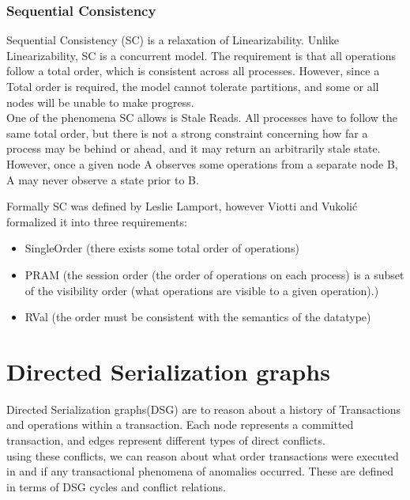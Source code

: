\documentclass[a4paper,10pt,titlepage]{report}
\begin{document}
\subsubsection{Sequential Consistency}
Sequential Consistency (SC) is a relaxation of Linearizability. Unlike Linearizability, SC is a concurrent model. The requirement is that all operations follow a total order, which is consistent across all processes. However, since a Total order is required, the model cannot tolerate partitions, and some or all nodes will be unable to make progress. 
\\ \vspace{5mm}
One of the phenomena SC allows is Stale Reads. All processes have to follow the same total order, but there is not a strong constraint concerning how far a process may be behind or ahead, and it may return an arbitrarily stale state. However, once a given node A observes some operations from a separate node B, A may never observe a state prior to B.

Formally SC was defined by Leslie Lamport\cite{Lamport1979how}, however Viotti and Vukolić\cite{ConsistencyinNonTransactionalDistributedStorageSystems} formalized it into three requirements:
\begin{itemize}
    \item SingleOrder (there exists some total order of operations)
    \item PRAM (the session order (the order of operations on each process) is a subset of the visibility order (what operations are visible to a given operation).)
    \item RVal (the order must be consistent with the semantics of the datatype)
\end{itemize}




\section{Directed Serialization graphs}

Directed Serialization graphs(DSG) are to reason about a history of Transactions and operations within a transaction. Each node represents a committed transaction, and edges represent different types of direct conflicts. \\ using these conflicts, we can reason about what order transactions were executed in and if any transactional phenomena of anomalies occurred. These are defined in terms of DSG cycles and conflict relations. 
\end{document}
